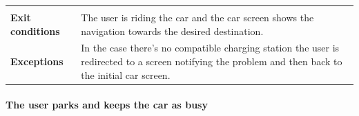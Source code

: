 \documentclass[]{article}
\let\oldparagraph\paragraph
\renewcommand{\paragraph}[1]{\oldparagraph{#1}\mbox{}}
\begin{document}
\begin{longtable}[]{@{}ll@{}}
\begin{minipage}[t]{0.65\columnwidth}
\end{minipage}\tabularnewline
\begin{minipage}[t]{0.29\columnwidth}\raggedright\strut
\textbf{Exit conditions}\strut
\end{minipage} & \begin{minipage}[t]{0.65\columnwidth}\raggedright\strut
The user is riding the car and the car screen shows the navigation
towards the desired destination.\strut
\end{minipage}\tabularnewline
\begin{minipage}[t]{0.29\columnwidth}\raggedright\strut
\textbf{Exceptions}\strut
\end{minipage} & \begin{minipage}[t]{0.65\columnwidth}\raggedright\strut
In the case there's no compatible charging station the user is
redirected to a screen notifying the problem and then back to the
initial car screen.\strut
\end{minipage}\tabularnewline
\bottomrule
\end{longtable}

\newpage

\paragraph{The user parks and keeps the car as
busy}\label{the-user-parks-and-keeps-the-car-as-busy}
\end{document}

